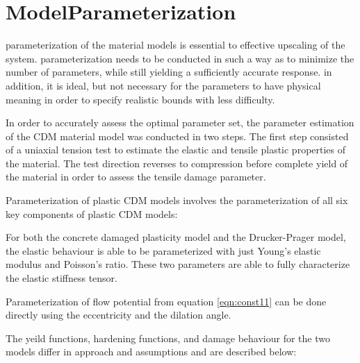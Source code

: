 \section{ModelParameterization}
parameterization of the material models is essential to effective upscaling of the system. parameterization needs to be conducted in such a way as to minimize the number of parameters, while still yielding a sufficiently accurate response. in addition, it is ideal, but not necessary for the parameters to have physical meaning in order to specify realistic bounds with less difficulty.

In order to accurately assess the optimal parameter set, the parameter estimation of the CDM material model was conducted in two steps. The first step consisted of a uniaxial tension test to estimate the elastic and tensile plastic properties of the material. The test direction reverses to compression before complete yield of the material in order to assess the tensile damage parameter. 

Parameterization of plastic CDM models involves the parameterization of all six key components of plastic CDM models:

For both the concrete damaged plasticity model and the Drucker-Prager model, the elastic behaviour is able to be parameterized with just Young's elastic modulus and Poisson's ratio. These two parameters are able to fully characterize the elastic stiffness tensor.

Parameterization of flow potential from equation \ref{eqn:const11} can be done directly using the eccentricity and the dilation angle.

The yeild functions, hardening functions, and damage behaviour for the two models differ in approach and assumptions and are described below:
